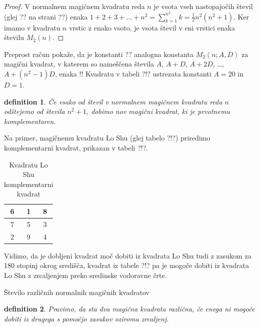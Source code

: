 \documentclass[a4paper,12pt]{article}
\newtheorem{definition}{definition}
\begin{document}
\begin{proof}
   V normalnem magičnem kvadratu reda $n$ je vsota vseh nastopajočih
   števil (glej ?? na strani ??) enaka
   $1+2+3+\dots+n^2=\sum_{k=1}^{n^2}k=\frac{1}{2}n^2(n^2+1)$. Ker imamo
   v kvadratu $n$ vrstic z enako vsoto, je vsota števil v eni vrstici
   enaka številu $M_2(n)$. %
   \end{proof}

Preprost račun pokaže, da je konstanti ?? analogna konstanta
$M_2(n;A,D)$ za magični kvadrat, v katerem so nameščena števila
$A$, $A+D$, $A+2D$, \dots, $A+(n^2-1)D$, enaka %
!!
Kvadratu v tabeli ?!? ustrezata konstanti $A=20$ in $D=1$.

\begin{definition}
      Če vsako od števil v normalnem magičnem kvadratu reda $n$ odštejemo
      od števila $n^2+1$, dobimo nov magični kvadrat, ki je prvotnemu
      \emph{komplementaren}.
\end{definition}

Na primer, magičnemu kvadratu Lo Shu (glej tabelo ?!?) priredimo
komplementarni kvadrat, prikazan v tabeli ?!?.
%
\begin{table}[h!]
   \centering
   \caption{Kvadratu Lo Shu komplementarni kvadrat}
   \label{table:closhu}
   \begin{tabular}{|c|c|c|}
      \hline
      6 & 1 & 8 \\\hline
      7 & 5 & 3 \\\hline
      2 & 9 & 4 \\\hline
      \end{tabular}
\end{table}

Vidimo, da je dobljeni kvadrat moč dobiti iz kvadrata Lo Shu tudi z zasukom za
180 stopinj okrog središča, kvadrat iz tabele ?!? pa je mogoče dobiti
iz kvadrata Lo Shu z zrcaljenjem preko sredinske vodoravne črte.

Število različnih normalnih magičnih kvadratov

\begin{definition}
      Pravimo, da sta dva magična kvadrata \emph{različna}, če enega ni mogoče dobiti
      iz drugega s pomočjo zasukov oziroma zrcaljenj.
\end{definition}
\end{document}
